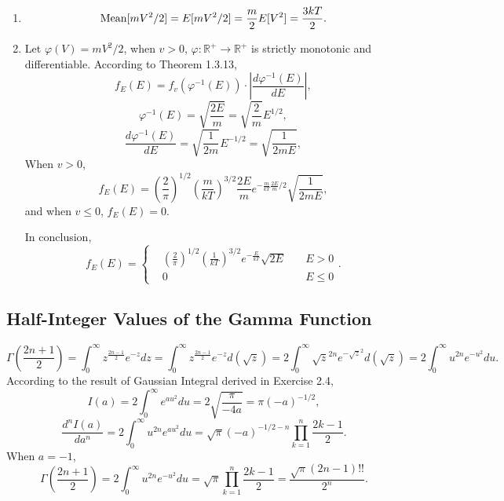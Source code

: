 \documentclass[11pt,a4paper]{article}
\begin{document}
\begin{enumerate}[label=\roman*)]
\item
$${\rm Mean}[mV^2/2]=E[mV^2/2]=\frac{m}{2}E[V^2]=\frac{3kT}{2}.$$
\item
Let $\varphi(V)=mV^2/2$, when $v>0$, $\varphi:\mathbb{R}^+\to\mathbb{R}^+$ is strictly monotonic and differentiable. According to Theorem 1.3.13,
$$f_E(E)=f_v(\varphi^{-1}(E))\cdot\left|\frac{d\varphi^{-1}(E)}{dE}\right|,$$
$$\varphi^{-1}(E)=\sqrt{\frac{2E}{m}}=\sqrt{\frac{2}{m}}E^{1/2},$$
$$\frac{d\varphi^{-1}(E)}{dE}=\sqrt{\frac{1}{2m}}E^{-1/2}=\sqrt{\frac{1}{2mE}},$$
When $v>0$,
$$f_E(E)=\left(\frac{2}{\pi}\right)^{1/2}\left(\frac{m}{kT}\right)^{3/2}\frac{2E}{m}e^{-\frac{m}{kT}\frac{2E}{m}/2}\sqrt{\frac{1}{2mE}},$$
and when $v\leqslant 0$, $f_E(E)=0$.

In conclusion,
$$f_E(E)=\left\{\begin{aligned}
&\left(\frac{2}{\pi}\right)^{1/2}\left(\frac{1}{kT}\right)^{3/2}e^{-\frac{E}{kT}}\sqrt{2E}&\quad E>0\\
&0&\quad E\leqslant0
\end{aligned}\right..$$
\end{enumerate}

\subsection{Half-Integer Values of the Gamma Function}
$$\Gamma\left(\frac{2n+1}{2}\right)=\int_0^\infty z^{\frac{2n-1}{2}}e^{-z}dz=\int_0^\infty z^{\frac{2n-1}{2}}e^{-z}d(\sqrt{z})=2\int_0^\infty\sqrt{z}^{2n}e^{-\sqrt{z}^2}d(\sqrt{z})=2\int_0^\infty u^{2n}e^{-u^2}du.$$
According to the result of Gaussian Integral derived in Exercise 2.4,
$$I(a)=2\int_0^\infty e^{au^2}du=2\sqrt{\frac{\pi}{-4a}}=\pi(-a)^{-1/2},$$
$$\frac{d^nI(a)}{da^n}=2\int_0^\infty u^{2n}e^{au^2}du=\sqrt{\pi}(-a)^{-1/2-n}\prod_{k=1}^n\frac{2k-1}{2}.$$
When $a=-1$,
$$\Gamma\left(\frac{2n+1}{2}\right)=2\int_0^\infty u^{2n}e^{-u^2}du=\sqrt{\pi}\prod_{k=1}^n\frac{2k-1}{2}=\frac{\sqrt{\pi}(2n-1)!!}{2^n}.$$
\end{document}
